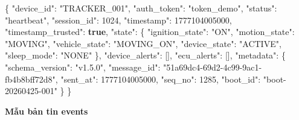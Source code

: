\documentclass[a4paper]{extarticle}
\newenvironment{Shaded}{}{}
\newcommand{\DataTypeTok}[1]{\textcolor[rgb]{0.56,0.13,0.00}{#1}}
\newcommand{\DecValTok}[1]{\textcolor[rgb]{0.25,0.63,0.44}{#1}}
\newcommand{\FunctionTok}[1]{\textcolor[rgb]{0.02,0.16,0.49}{#1}}
\newcommand{\KeywordTok}[1]{\textcolor[rgb]{0.00,0.44,0.13}{\textbf{#1}}}
\newcommand{\OtherTok}[1]{\textcolor[rgb]{0.00,0.44,0.13}{#1}}
\newcommand{\StringTok}[1]{\textcolor[rgb]{0.25,0.44,0.63}{#1}}
\newcommand{\thesisterm}[1]{{\rmfamily #1}}
\begin{document}
\begin{Shaded}
\begin{Highlighting}[]
\FunctionTok{\{}
  \DataTypeTok{"device\_id"}\FunctionTok{:} \StringTok{"TRACKER\_001"}\FunctionTok{,}
  \DataTypeTok{"auth\_token"}\FunctionTok{:} \StringTok{"token\_demo"}\FunctionTok{,}
  \DataTypeTok{"status"}\FunctionTok{:} \StringTok{"heartbeat"}\FunctionTok{,}
  \DataTypeTok{"session\_id"}\FunctionTok{:} \DecValTok{1024}\FunctionTok{,}
  \DataTypeTok{"timestamp"}\FunctionTok{:} \DecValTok{1777104005000}\FunctionTok{,}
  \DataTypeTok{"timestamp\_trusted"}\FunctionTok{:} \KeywordTok{true}\FunctionTok{,}
  \DataTypeTok{"state"}\FunctionTok{:} \FunctionTok{\{}
    \DataTypeTok{"ignition\_state"}\FunctionTok{:} \StringTok{"ON"}\FunctionTok{,}
    \DataTypeTok{"motion\_state"}\FunctionTok{:} \StringTok{"MOVING"}\FunctionTok{,}
    \DataTypeTok{"vehicle\_state"}\FunctionTok{:} \StringTok{"MOVING\_ON"}\FunctionTok{,}
    \DataTypeTok{"device\_state"}\FunctionTok{:} \StringTok{"ACTIVE"}\FunctionTok{,}
    \DataTypeTok{"sleep\_mode"}\FunctionTok{:} \StringTok{"NONE"}
  \FunctionTok{\},}
  \DataTypeTok{"device\_alerts"}\FunctionTok{:} \OtherTok{[]}\FunctionTok{,}
  \DataTypeTok{"ecu\_alerts"}\FunctionTok{:} \OtherTok{[]}\FunctionTok{,}
  \DataTypeTok{"metadata"}\FunctionTok{:} \FunctionTok{\{}
    \DataTypeTok{"schema\_version"}\FunctionTok{:} \StringTok{"v1.5.0"}\FunctionTok{,}
    \DataTypeTok{"message\_id"}\FunctionTok{:} \StringTok{"51a69dc4{-}69d2{-}4c99{-}9ac1{-}fb4b8bff72d8"}\FunctionTok{,}
    \DataTypeTok{"sent\_at"}\FunctionTok{:} \DecValTok{1777104005000}\FunctionTok{,}
    \DataTypeTok{"seq\_no"}\FunctionTok{:} \DecValTok{1285}\FunctionTok{,}
    \DataTypeTok{"boot\_id"}\FunctionTok{:} \StringTok{"boot{-}20260425{-}001"}
  \FunctionTok{\}}
\FunctionTok{\}}
\end{Highlighting}
\end{Shaded}

\textbf{Mẫu bản tin \thesisterm{events}}
\end{document}
